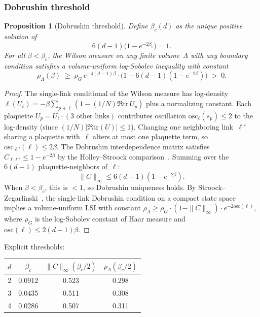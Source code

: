 \documentclass[11pt]{article}
\newtheorem{proposition}[theorem]{Proposition}
\theoremstyle{definition}
\newcommand{\tr}{\mathrm{tr}}
\newcommand{\osc}{\mathrm{osc}}
\begin{document}
\subsubsection{Dobrushin threshold}

\begin{proposition}[Dobrushin threshold]
\label{syn-prop:dobrushin}
Define $\beta_c(d)$ as the unique positive solution of
\begin{equation}\label{syn-eq:threshold}
  6(d{-}1)\bigl(1 - e^{-2\beta_c}\bigr) = 1.
\end{equation}
For all $\beta < \beta_c$, the Wilson measure on any finite
volume~$\Lambda$ with any boundary condition satisfies
a volume-uniform log-Sobolev inequality with constant
\begin{equation}
  \rho_\Lambda(\beta) \;\geq\;
  \rho_G\,e^{-4(d-1)\beta}
  \cdot\bigl(1 - 6(d{-}1)(1 - e^{-2\beta})\bigr)
  \;>\; 0.
\end{equation}
\end{proposition}

\begin{proof}
The single-link conditional of the Wilson measure has
log-density $\ell(U_\ell) = -\beta\sum_{p \ni \ell}
(1 - (1/N)\Re\tr\,U_p)$ plus a normalizing constant.
Each plaquette $U_p = U_\ell \cdot (\text{3 other links})$
contributes oscillation $\osc_\ell(s_p) \leq 2$ to the
log-density (since $(1/N)|\Re\tr(U)| \leq 1$).
Changing one neighboring link~$\ell'$ sharing
a plaquette with~$\ell$ alters at most one plaquette
term, so $\osc_{\ell'}(\ell) \leq 2\beta$.
The Dobrushin interdependence matrix satisfies
$C_{\ell\ell'} \leq 1 - e^{-2\beta}$
by the Holley--Stroock comparison~\cite{HolleyStroock}.
Summing over the $6(d{-}1)$ plaquette-neighbors of~$\ell$:
\[
  \|C\|_\infty \leq 6(d{-}1)(1 - e^{-2\beta}).
\]
When $\beta < \beta_c$, this is $< 1$, so
Dobrushin uniqueness holds.
By Stroock--Zegarlinski~\cite{StroockZegarlinski},
the single-link Dobrushin condition on a compact state
space implies a volume-uniform LSI with constant
$\rho_\Lambda \geq \rho_G \cdot (1 - \|C\|_\infty)
\cdot e^{-2\osc(\ell)}$,
where $\rho_G$ is the log-Sobolev constant of
Haar measure and $\osc(\ell) \leq 2(d{-}1)\beta$.
\end{proof}

\noindent Explicit thresholds:
\begin{center}
\begin{tabular}{@{}cccc@{}}
\toprule
$d$ & $\beta_c$ & $\|C\|_\infty(\beta_c/2)$ &
$\rho_\Lambda(\beta_c/2)$ \\ \midrule
2 & 0.0912 & 0.523 & 0.298 \\
3 & 0.0435 & 0.511 & 0.308 \\
4 & 0.0286 & 0.507 & 0.311 \\
\bottomrule
\end{tabular}
\end{center}
\end{document}
